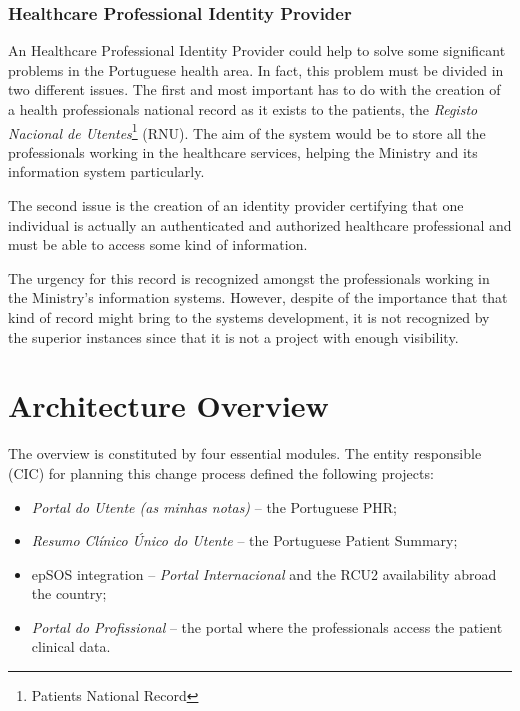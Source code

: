 \subsubsection{Healthcare Professional Identity Provider}\label{sec:hpip}

An Healthcare Professional Identity Provider could help to solve some significant problems in the Portuguese health area. In fact, this problem must be divided in two different issues. The first and most important has to do with the creation of a health professionals national record as it exists to the patients, the \textit{Registo Nacional de Utentes}\footnote{Patients National Record} (RNU). The aim of the system would be to store all the professionals working in the healthcare services, helping the Ministry and its information system particularly.

The second issue is the creation of an identity provider certifying that one individual is actually an authenticated and authorized healthcare professional and must be able to access some kind of information.

The urgency for this record is recognized amongst the professionals working in the Ministry's information systems. However, despite of the importance that that kind of record might bring to the systems development, it is not recognized by the superior instances since that it is not a project with enough visibility.





\section{Architecture Overview}

The overview is constituted by four essential modules. The entity responsible (CIC) for planning this change process defined the following projects:
\begin{itemize}
\item \textit{Portal do Utente (as minhas notas)} -- the Portuguese PHR;
\item \textit{Resumo Clínico Único do Utente} -- the Portuguese Patient Summary;
\item epSOS integration -- \textit{Portal Internacional} and the RCU2 availability abroad the country;
\item \textit{Portal do Profissional} -- the portal where the professionals access the patient clinical data.
\end{itemize}

